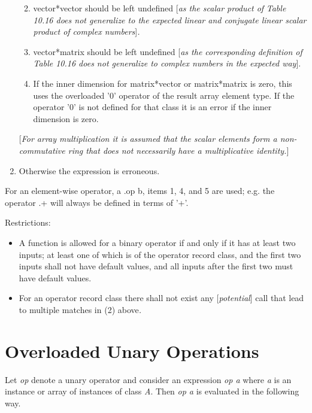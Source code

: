 \documentclass[10pt,a4paper]{report}
\def\doublelabel#1{\label{#1}\hypertarget{#1}{}}
\renewcommand{\labelenumi}{\arabic{enumi}.}
\renewcommand{\labelenumii}{\labelenumi\arabic{enumii}.}
\begin{document}
\begin{enumerate}
  \begin{enumerate}
  \def\labelenumii{(\alph{enumii})}
  \item
    vector*vector should be left undefined {[}\emph{as the scalar
    product of} \emph{Table 10.16 does not generalize to the expected
    linear and conjugate linear scalar product of complex
    numbers}{]}\emph{.}
  \item
    vector*matrix should be left undefined {[}\emph{as the corresponding
    definition of} \emph{Table 10.16 does not generalize to complex
    numbers in the expected way}{]}.
  \item
    If the inner dimension for matrix*vector or matrix*matrix is zero,
    this uses the overloaded '0' operator of the result array element
    type. If the operator '0' is not defined for that class it is an
    error if the inner dimension is zero.
  \end{enumerate}
{[}\emph{For array multiplication it is assumed that the scalar elements
form a non-commutative ring that does not necessarily have a
multiplicative identity.}{]}
\item
  Otherwise the expression is erroneous.
\end{enumerate}

For an element-wise operator, a .op b, items 1, 4, and 5 are used; e.g.
the operator .+ will always be defined in terms of '+'.

Restrictions:

\begin{itemize}
\item
  A function is allowed for a binary operator if and only if it has at
  least two inputs; at least one of which is of the operator record
  class, and the first two inputs shall not have default values, and all
  inputs after the first two must have default values.
\item
  For an operator record class there shall not exist {any}
  {[}\emph{potential}{]} call that lead to multiple matches in (2)
  above\emph{.}
\end{itemize}

\section{Overloaded Unary Operations}\doublelabel{overloaded-unary-operations}

Let \emph{op} denote a unary operator and consider an expression
\emph{op a} where \emph{a} is an instance or array of instances of class
\emph{A}. Then \emph{op a} is evaluated in the following way.
\end{document}
